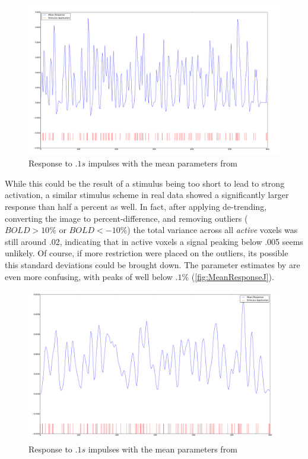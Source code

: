 \begin{figure}
\centering
\label{fig:MeanResponseF}
\includegraphics[trim=6cm 3cm 6cm 3cm,width=16cm]{images/mean_response}
\caption{Response to $.1s$ impulses with the mean parameters from \cite{Friston2000}}
\end{figure}

While this could be the result of a stimulus
being too short to lead to strong activation, a similar stimulus
scheme in real data showed a significantly larger response than 
half a percent as well. In fact, after applying de-trending,
converting the image to percent-difference, and removing 
outliers ($ BOLD > 10\% \text{ or } BOLD < -10\%$) the total variance
across all \emph{active} voxels was still around .02, indicating
that in active voxels a signal peaking below .005 seems unlikely. 
Of course, if more restriction were placed on the outliers, its possible
this standard deviations could be brought down. 
The parameter estimates by \cite{Johnston2008} are even more 
confusing, with peaks of well below $.1\%$ (\autoref{fig:MeanResponseJ}).

\begin{figure}
\centering
\label{fig:MeanResponseJ}
\includegraphics[trim=6cm 3cm 6cm 3cm,width=16cm]{images/mean_response_johnston}
\caption{Response to $.1s$ impulses with the mean parameters from \cite{Johnston2008}}
\end{figure}

